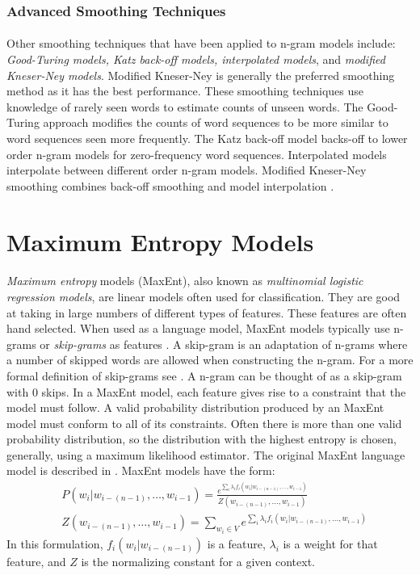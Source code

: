 \subsubsection{Advanced Smoothing Techniques}
\paragraph{}
 Other smoothing techniques that have been applied to n-gram models include: \emph{Good-Turing models, Katz back-off models, interpolated models}, and \emph{modified Kneser-Ney models}. Modified Kneser-Ney is generally the preferred smoothing method as it has the best performance. These smoothing techniques use knowledge of rarely seen words to estimate counts of unseen words. The Good-Turing approach modifies the counts of word sequences to be more similar to word sequences seen more frequently. The Katz back-off model backs-off to lower order n-gram models for zero-frequency word sequences. Interpolated models interpolate between different order n-gram models. Modified Kneser-Ney smoothing combines back-off smoothing and model interpolation \cite{Jurafsky2009}.

\section{Maximum Entropy  Models}
\paragraph{}
\emph{Maximum entropy} models (MaxEnt), also known as \emph{multinomial logistic regression models}, are linear models often used for classification. They are good at taking in large numbers of different types of features. These features are often hand selected. When used as a language model, MaxEnt models typically use n-grams or \emph{skip-grams} as features \cite{Mikolov2012}. A skip-gram is an adaptation of n-grams where a number of skipped words are allowed when constructing the n-gram. For a more formal definition of skip-grams see \cite{Guthrie2006}. A n-gram can be thought of as a skip-gram with 0 skips. In a MaxEnt model, each feature gives rise to a constraint that the model must follow. A valid probability distribution produced by an MaxEnt model must conform to all of its constraints. Often there is more than one valid probability distribution, so the distribution with the highest entropy is chosen, generally, using a maximum likelihood estimator. The original MaxEnt language model is described in \cite{Rosenfeld1994}.
MaxEnt models have the form:
\begin{align}
&P(w_i | w_{i-(n-1)},\dots, w_{i-1}) = \frac{e^{\sum_i \lambda_i f_i(w_i | w_{i-(n-1)},\dots, w_{i-1})}}{Z(w_{i-(n-1)},
\dots, w_{i-1})} \label{eq:maxent}
\\
&Z(w_{i-(n-1)},\dots, w_{i-1}) = \sum_{w_i \in V} e^{\sum_i \lambda_i f_i(w_i | w_{i-(n-1)},\dots, w_{i-1})} \nonumber
\end{align}
In this formulation, $f_i(w_i | w_{i-(n-1)})$ is a feature, $\lambda_i$ is a weight for that feature, and $Z$ is the normalizing constant for a given context.
